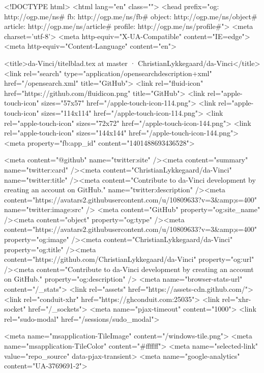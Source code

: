 


<!DOCTYPE html>
<html lang="en" class="">
  <head prefix="og: http://ogp.me/ns# fb: http://ogp.me/ns/fb# object: http://ogp.me/ns/object# article: http://ogp.me/ns/article# profile: http://ogp.me/ns/profile#">
    <meta charset='utf-8'>
    <meta http-equiv="X-UA-Compatible" content="IE=edge">
    <meta http-equiv="Content-Language" content="en">
    
    
    <title>da-Vinci/titelblad.tex at master · ChristianLykkegaard/da-Vinci</title>
    <link rel="search" type="application/opensearchdescription+xml" href="/opensearch.xml" title="GitHub">
    <link rel="fluid-icon" href="https://github.com/fluidicon.png" title="GitHub">
    <link rel="apple-touch-icon" sizes="57x57" href="/apple-touch-icon-114.png">
    <link rel="apple-touch-icon" sizes="114x114" href="/apple-touch-icon-114.png">
    <link rel="apple-touch-icon" sizes="72x72" href="/apple-touch-icon-144.png">
    <link rel="apple-touch-icon" sizes="144x144" href="/apple-touch-icon-144.png">
    <meta property="fb:app_id" content="1401488693436528">

      <meta content="@github" name="twitter:site" /><meta content="summary" name="twitter:card" /><meta content="ChristianLykkegaard/da-Vinci" name="twitter:title" /><meta content="Contribute to da-Vinci development by creating an account on GitHub." name="twitter:description" /><meta content="https://avatars2.githubusercontent.com/u/10809633?v=3&amp;s=400" name="twitter:image:src" />
      <meta content="GitHub" property="og:site_name" /><meta content="object" property="og:type" /><meta content="https://avatars2.githubusercontent.com/u/10809633?v=3&amp;s=400" property="og:image" /><meta content="ChristianLykkegaard/da-Vinci" property="og:title" /><meta content="https://github.com/ChristianLykkegaard/da-Vinci" property="og:url" /><meta content="Contribute to da-Vinci development by creating an account on GitHub." property="og:description" />
      <meta name="browser-stats-url" content="/_stats">
    <link rel="assets" href="https://assets-cdn.github.com/">
    <link rel="conduit-xhr" href="https://ghconduit.com:25035">
    <link rel="xhr-socket" href="/_sockets">
    <meta name="pjax-timeout" content="1000">
    <link rel="sudo-modal" href="/sessions/sudo_modal">

    <meta name="msapplication-TileImage" content="/windows-tile.png">
    <meta name="msapplication-TileColor" content="#ffffff">
    <meta name="selected-link" value="repo_source" data-pjax-transient>
      <meta name="google-analytics" content="UA-3769691-2">

